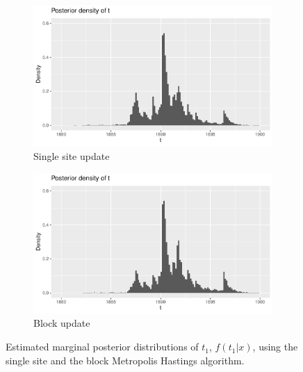 \begin{figure}[H]
    \centering
    \begin{subfigure}[b]{0.49\textwidth}
        \centering
        \includegraphics[width = \textwidth]{Images/post_t_single.pdf}
        \caption{Single site update}
        \label{fig:post_t_single}
    \end{subfigure}
    \begin{subfigure}[b]{0.49\textwidth}
        \centering
        \includegraphics[width = \textwidth]{Images/post_t_block.pdf}
        \caption{Block update}
        \label{fig:post_t_block}
    \end{subfigure}
     \caption{Estimated marginal posterior distributions of $t_1$, $f(t_1|x)$, using the single site and the block Metropolis Hastings algorithm.}
    \label{fig:post_t}
\end{figure}


